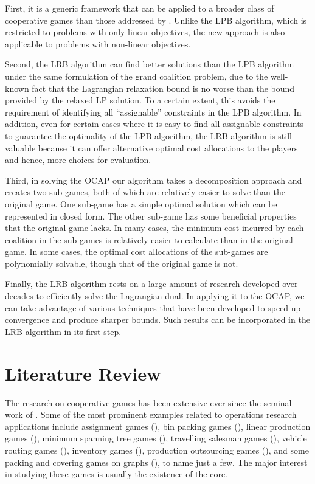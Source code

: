 \documentclass[ijoc,nonblindrev]{informs3} %
\begin{document}
First, it is a generic framework that can be applied to a broader class of cooperative games than those addressed by \cite{Caprara2010LPB}. 
Unlike the LPB algorithm, which is restricted to problems with only linear objectives, the new approach is also applicable to problems with non-linear objectives. 

Second, the LRB algorithm can find better solutions than the LPB algorithm under the same formulation of the grand coalition problem, due to the well-known fact that the Lagrangian relaxation bound is no worse than the bound provided by the relaxed LP solution. To a certain extent, this avoids the  requirement of identifying all ``assignable'' constraints in  the LPB algorithm. In addition, even for certain cases where it is easy to find all assignable constraints to  guarantee the optimality of the LPB algorithm, the LRB algorithm is still valuable because it can offer alternative optimal cost allocations to the players and hence, more choices for evaluation.

Third, in solving the OCAP our algorithm takes a decomposition approach and creates two sub-games, both of which are relatively easier to solve than the original game. One sub-game has a simple optimal solution which can be represented in closed form. The other sub-game has some beneficial properties that the original game lacks.  
In many cases, the minimum cost incurred by each coalition in the sub-games is relatively easier to calculate than in the original game. In some cases, the optimal cost allocations of the sub-games are polynomially solvable, though that of the original game is not.


Finally, the LRB algorithm rests on a large amount of research developed over decades to efficiently solve the Lagrangian dual.  In applying it to the OCAP, we can take advantage of various techniques that have been developed to speed up convergence and produce sharper bounds. Such results can be incorporated in the LRB algorithm in its first step.  



\section{Literature Review}\label{sec:review}

The research on cooperative games has been extensive ever since the seminal work of \cite{shapley1952value}.  Some of the most prominent examples related to operations research applications include assignment games (\citealt{Shapley1971AssignmentGame,Martinez2013}), bin packing games (\citealt{Faigle1993,Liu2009}), linear production games (\citealt{Owen1975LinearProductionGames}), minimum spanning tree games (\citealt{Granot1981MinimumSpanningTreeGames}), travelling salesman games (\citealt{Tamir1989TSPGames,Potters1992}), vehicle routing games (\citealt{Gothe1996VehicleRoutingGames,Engevall2004}), inventory games (\citealt{Hartman2000, Chen2009, Chen2009b, He2012,Zhang2009}), production outsourcing games (\citealt{Aydinliyim2010,Cai2012}), and some packing and covering games on graphs (\citealt{Deng1999PackingAndCoveringGames}), to name just a few. 
The major interest in studying these games is usually the existence of the core.
\end{document}
